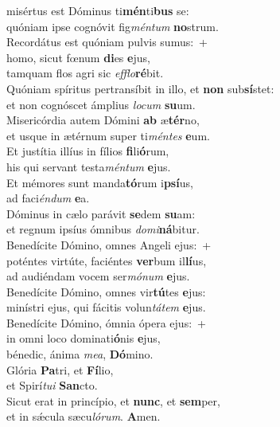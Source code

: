 \oddverse  misértus est Dóminus ti\textbf{mén}ti\textbf{bus} se:~\*\\
\oddverse quóniam ipse cognóvit fig\textit{mén}\textit{tum} \textbf{no}strum.\\
\evenverse Recordátus est quóniam pulvis sumus:~+\\
\evenverse  homo, sicut fœnum \textbf{di}es \textbf{e}jus,~\*\\
\evenverse tamquam flos agri sic \textit{ef}\textit{flo}\textbf{ré}bit.\\
\oddverse Quóniam spíritus pertransíbit in illo, et \textbf{non} sub\textbf{sí}stet:~\*\\
\oddverse et non cognóscet ámplius \textit{lo}\textit{cum} \textbf{su}um.\\
\evenverse Misericórdia autem Dómini \textbf{ab} æ\textbf{tér}no,~\*\\
\evenverse et usque in ætérnum super ti\textit{mén}\textit{tes} \textbf{e}um.\\
\oddverse Et justítia illíus in fílios \textbf{fi}li\textbf{ó}rum,~\*\\
\oddverse his qui servant testa\textit{mén}\textit{tum} \textbf{e}jus.\\
\evenverse Et mémores sunt manda\textbf{tó}rum i\textbf{psí}us,~\*\\
\evenverse ad faci\textit{én}\textit{dum} \textbf{e}a.\\
\oddverse Dóminus in cælo parávit \textbf{se}dem \textbf{su}am:~\*\\
\oddverse et regnum ipsíus ómnibus \textit{do}\textit{mi}\textbf{ná}bitur.\\
\evenverse Benedícite Dómino, omnes Angeli ejus:~+\\
\evenverse  poténtes virtúte, faciéntes \textbf{ver}bum il\textbf{lí}us,~\*\\
\evenverse ad audiéndam vocem ser\textit{mó}\textit{num} \textbf{e}jus.\\
\oddverse Benedícite Dómino, omnes vir\textbf{tú}tes \textbf{e}jus:~\*\\
\oddverse minístri ejus, qui fácitis volun\textit{tá}\textit{tem} \textbf{e}jus.\\
\evenverse Benedícite Dómino, ómnia ópera ejus:~+\\
\evenverse  in omni loco dominati\textbf{ó}nis \textbf{e}jus,~\*\\
\evenverse bénedic, ánima \textit{me}\textit{a}, \textbf{Dó}mino.\\
\oddverse Glória \textbf{Pa}tri, et \textbf{Fí}lio,~\*\\
\oddverse et Spirí\textit{tu}\textit{i} \textbf{San}cto.\\
\evenverse Sicut erat in princípio, et \textbf{nunc}, et \textbf{sem}per,~\*\\
\evenverse et in sǽcula sæcu\textit{ló}\textit{rum}. \textbf{A}men.\\
